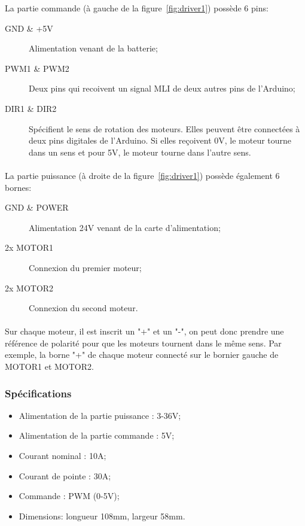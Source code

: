 La partie commande (à gauche de la figure~\ref{fig:driver1}) possède 6 pins:

\begin{description}
	\item[GND \& +5V] Alimentation venant de la batterie;
	\item[PWM1 \& PWM2] Deux pins qui recoivent un signal MLI de deux autres pins de l'Arduino;
	\item[DIR1 \& DIR2] Spécifient le sens de rotation des moteurs. Elles peuvent être connectées à deux pins digitales de l’Arduino. Si elles reçoivent 0V, le moteur tourne dans un sens et pour 5V, le moteur tourne dans l’autre sens.
\end{description}

\paragraph{}
La partie puissance (à droite de la figure~\ref{fig:driver1}) possède également 6 bornes:

\begin{description}
	\item[GND \& POWER] Alimentation 24V venant de la carte d'alimentation;
	\item[2x MOTOR1] Connexion du premier moteur;
	\item[2x MOTOR2] Connexion du second moteur.
\end{description}

\paragraph{}
Sur chaque moteur, il est inscrit un "+" et un "-", on peut donc prendre une référence de polarité pour que les moteurs tournent dans le même sens. Par exemple, la borne "+" de chaque moteur connecté sur le bornier gauche de MOTOR1 et MOTOR2.

\subsubsection{Spécifications}\label{spec}
\begin{itemize}
	\item Alimentation de la partie puissance : 3-36V;
	\item Alimentation de la partie commande : 5V;
	\item Courant nominal : 10A;
	\item Courant de pointe : 30A;
	\item Commande : PWM (0-5V);
	\item Dimensions: longueur 108mm, largeur 58mm.
\end{itemize}

